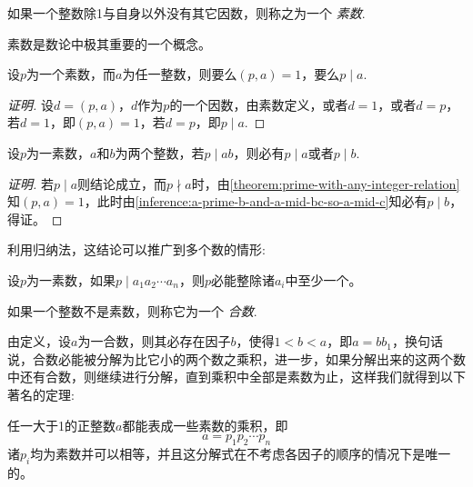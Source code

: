 \begin{definition}
  如果一个整数除1与自身以外没有其它因数，则称之为一个 \emph{素数}.
\end{definition}

素数是数论中极其重要的一个概念。

\begin{theorem}
  \label{theorem:prime-with-any-integer-relation}
  设$p$为一个素数，而$a$为任一整数，则要么$(p,a)=1$，要么$p \mid a$.
\end{theorem}

\begin{proof}[证明]
  设$d=(p,a)$，$d$作为$p$的一个因数，由素数定义，或者$d=1$，或者$d=p$，若$d=1$，即$(p,a)=1$，若$d=p$，即$p \mid a$.
\end{proof}

\begin{inference}
  设$p$为一素数，$a$和$b$为两个整数，若$p \mid ab$，则必有$p \mid a$或者$p \mid b$.
\end{inference}

\begin{proof}[证明]
  若$p \mid a$则结论成立，而$p \nmid a$时，由\autoref{theorem:prime-with-any-integer-relation}知$(p,a)=1$，此时由\autoref{inference:a-prime-b-and-a-mid-bc-so-a-mid-c}知必有$p \mid b$，得证。
\end{proof}

利用归纳法，这结论可以推广到多个数的情形:
\begin{inference}
  设$p$为一素数，如果$p \mid a_1a_2\cdots a_n$，则$p$必能整除诸$a_i$中至少一个。
\end{inference}

\begin{definition}
  如果一个整数不是素数，则称它为一个 \emph{合数}.
\end{definition}

由定义，设$a$为一合数，则其必存在因子$b$，使得$1<b<a$，即$a=bb_1$，换句话说，合数必能被分解为比它小的两个数之乘积，进一步，如果分解出来的这两个数中还有合数，则继续进行分解，直到乘积中全部是素数为止，这样我们就得到以下著名的定理:

\begin{theorem}[算术基本定理]
  \label{theorem:arithmetic-base-theorem}
  任一大于1的正整数$a$都能表成一些素数的乘积，即
  \[ a=p_1p_2 \cdots p_n \]
  诸$p_i$均为素数并可以相等，并且这分解式在不考虑各因子的顺序的情况下是唯一的。
\end{theorem}

